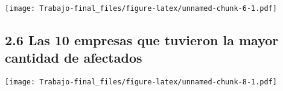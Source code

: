 \documentclass[
]{article}
\newenvironment{Shaded}{\begin{snugshade}}{\end{snugshade}}
\newcommand{\AttributeTok}[1]{\textcolor[rgb]{0.77,0.63,0.00}{#1}}
\newcommand{\DecValTok}[1]{\textcolor[rgb]{0.00,0.00,0.81}{#1}}
\newcommand{\FunctionTok}[1]{\textcolor[rgb]{0.00,0.00,0.00}{#1}}
\newcommand{\NormalTok}[1]{#1}
\newcommand{\OtherTok}[1]{\textcolor[rgb]{0.56,0.35,0.01}{#1}}
\newcommand{\SpecialCharTok}[1]{\textcolor[rgb]{0.00,0.00,0.00}{#1}}
\newcommand{\StringTok}[1]{\textcolor[rgb]{0.31,0.60,0.02}{#1}}
\begin{document}
\texttt{[image: Trabajo-final\_files/figure-latex/unnamed-chunk-6-1.pdf]}

\hypertarget{las-10-empresas-que-tuvieron-la-mayor-cantidad-de-afectados}{%
\subsection{2.6 Las 10 empresas que tuvieron la mayor cantidad de
afectados}\label{las-10-empresas-que-tuvieron-la-mayor-cantidad-de-afectados}}

\begin{Shaded}
\end{Shaded}

\texttt{[image: Trabajo-final\_files/figure-latex/unnamed-chunk-8-1.pdf]}
\end{document}
